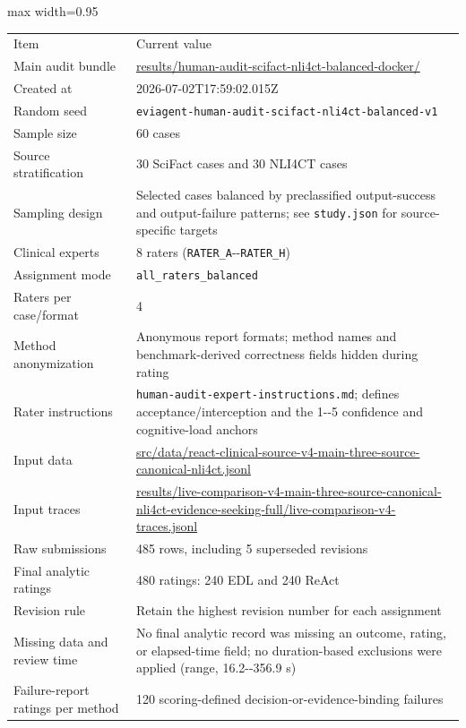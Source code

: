 \documentclass[
  8pt,
]{extarticle}
\begin{document}
\begin{center}
\begin{adjustbox}{max width=0.95\textwidth}
\begin{tabular}{@{}
ll@{}}
\toprule\noalign{}
Item & Current value \\

Main audit bundle &
\url{results/human-audit-scifact-nli4ct-balanced-docker/} \\
Created at & 2026-07-02T17:59:02.015Z \\
Random seed &
\texttt{eviagent-human-audit-scifact-nli4ct-balanced-v1} \\
Sample size & 60 cases \\
Source stratification & 30 SciFact cases and 30 NLI4CT cases \\
Sampling design & Selected cases balanced by preclassified
output-success and output-failure patterns; see \texttt{study.json} for
source-specific targets \\
Clinical experts & 8 raters (\texttt{RATER\_A}-\/-\texttt{RATER\_H}) \\
Assignment mode & \texttt{all\_raters\_balanced} \\
Raters per case/format & 4 \\
Method anonymization & Anonymous report formats; method names and
benchmark-derived correctness fields hidden during rating \\
Rater instructions & \texttt{human-audit-expert-instructions.md};
defines acceptance/interception and the 1-\/-5 confidence and
cognitive-load anchors \\
Input data &
\url{src/data/react-clinical-source-v4-main-three-source-canonical-nli4ct.jsonl} \\
Input traces &
\url{results/live-comparison-v4-main-three-source-canonical-nli4ct-evidence-seeking-full/live-comparison-v4-traces.jsonl} \\
Raw submissions & 485 rows, including 5 superseded revisions \\
Final analytic ratings & 480 ratings: 240 EDL and 240 ReAct \\
Revision rule & Retain the highest revision number for each
assignment \\
Missing data and review time & No final analytic record was missing an
outcome, rating, or elapsed-time field; no duration-based exclusions
were applied (range, 16.2-\/-356.9 s) \\
Failure-report ratings per method & 120 scoring-defined
decision-or-evidence-binding failures \\

\end{tabular}
\end{adjustbox}
\end{center}
\end{document}
